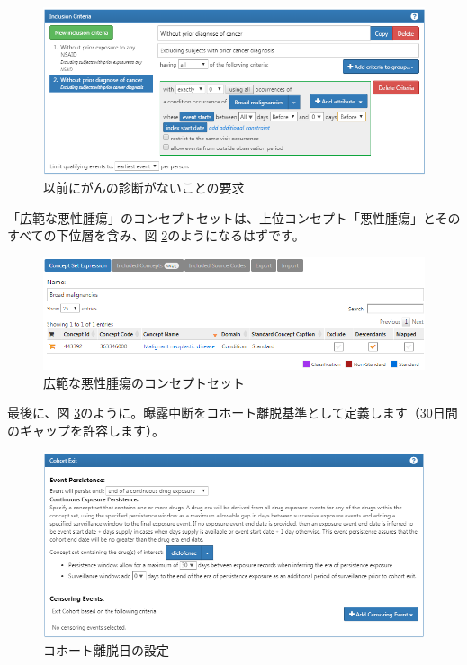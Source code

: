 \documentclass[
  11pt]{book}
\theoremstyle{definition}
\theoremstyle{definition}
\theoremstyle{definition}
\theoremstyle{definition}
\theoremstyle{remark}
\begin{document}
\begin{figure}

{\centering \includegraphics[width=1\linewidth]{images/SuggestedAnswers/cohortsAtlasInclusion2} 

}

\caption{以前にがんの診断がないことの要求}\label{fig:cohortsAtlasInclusion2}
\end{figure}

「広範な悪性腫瘍」のコンセプトセットは、上位コンセプト「悪性腫瘍」とそのすべての下位層を含み、図 \ref{fig:cohortsAtlasConceptSet3}のようになるはずです。

\begin{figure}

{\centering \includegraphics[width=1\linewidth]{images/SuggestedAnswers/cohortsAtlasConceptSet3} 

}

\caption{広範な悪性腫瘍のコンセプトセット}\label{fig:cohortsAtlasConceptSet3}
\end{figure}

最後に、図 \ref{fig:cohortsAtlasExit}のように。曝露中断をコホート離脱基準として定義します（30日間のギャップを許容します）。

\begin{figure}

{\centering \includegraphics[width=1\linewidth]{images/SuggestedAnswers/cohortsAtlasExit} 

}

\caption{コホート離脱日の設定}\label{fig:cohortsAtlasExit}
\end{figure}
\end{document}
